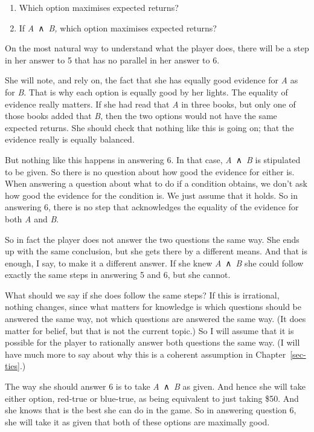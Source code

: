 \documentclass[
  12pt,
  letterpaper,
]{scrbook}
\providecommand{\tightlist}{%
  \setlength{\itemsep}{0pt}\setlength{\parskip}{0pt}}\usepackage{longtable,booktabs,array}
\begin{document}
\begin{enumerate}
\def\labelenumi{\arabic{enumi}.}
\setcounter{enumi}{4}
\tightlist
\item
  Which option maximises expected returns?
\item
  If \emph{A}~∧~\emph{B,} which option maximises expected returns?
\end{enumerate}

On the most natural way to understand what the player does, there will
be a step in her answer to 5 that has no parallel in her answer to 6.

She will note, and rely on, the fact that she has equally good evidence
for \emph{A} as for \emph{B}. That is why each option is equally good by
her lights. The equality of evidence really matters. If she had read
that \emph{A} in three books, but only one of those books added that
\emph{B}, then the two options would not have the same expected returns.
She should check that nothing like this is going on; that the evidence
really is equally balanced.

But nothing like this happens in answering 6. In that case,
\emph{A}~∧~\emph{B} is stipulated to be given. So there is no question
about how good the evidence for either is. When answering a question
about what to do if a condition obtains, we don't ask how good the
evidence for the condition is. We just assume that it holds. So in
answering 6, there is no step that acknowledges the equality of the
evidence for both \emph{A} and \emph{B}.

So in fact the player does not answer the two questions the same way.
She ends up with the same conclusion, but she gets there by a different
means. And that is enough, I say, to make it a different answer. If she
knew \emph{A}~∧~\emph{B} she could follow exactly the same steps in
answering 5 and 6, but she cannot.

What should we say if she does follow the same steps? If this is
irrational, nothing changes, since what matters for knowledge is which
questions should be answered the same way, not which questions are
answered the same way. (It does matter for belief, but that is not the
current topic.) So I will assume that it is possible for the player to
rationally answer both questions the same way. (I will have much more to
say about why this is a coherent assumption in Chapter~\ref{sec-ties}.)

The way she should answer 6 is to take \emph{A}~∧~\emph{B} as given. And
hence she will take either option, red-true or blue-true, as being
equivalent to just taking \$50. And she knows that is the best she can
do in the game. So in answering question 6, she will take it as given
that both of these options are maximally good.
\end{document}
